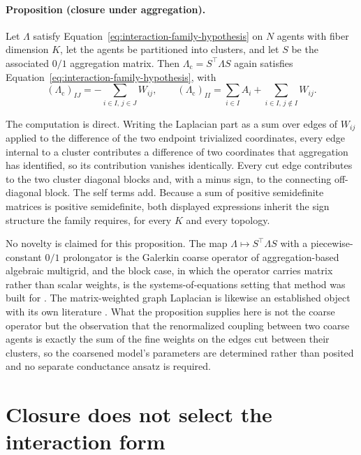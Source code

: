 \paragraph{Proposition (closure under aggregation).}
Let \(\Lambda\) satisfy Equation~\eqref{eq:interaction-family-hypothesis} on \(N\) agents with fiber dimension \(K\), let the agents be partitioned into clusters, and let \(S\) be the associated \(0/1\) aggregation matrix. Then \(\Lambda_{\mathrm{c}}=S^{\top}\Lambda S\) again satisfies Equation~\eqref{eq:interaction-family-hypothesis}, with
\begin{equation}
(\Lambda_{\mathrm{c}})_{IJ}
=-\sum_{i\in I,\,j\in J}W_{ij},
\qquad
(\Lambda_{\mathrm{c}})_{II}
=\sum_{i\in I}A_i+\sum_{i\in I,\,j\notin I}W_{ij}.
\label{eq:coarse-tying-blocks}
\end{equation}

The computation is direct. Writing the Laplacian part as a sum over edges of \(W_{ij}\) applied to the difference of the two endpoint trivialized coordinates, every edge internal to a cluster contributes a difference of two coordinates that aggregation has identified, so its contribution vanishes identically. Every cut edge contributes to the two cluster diagonal blocks and, with a minus sign, to the connecting off-diagonal block. The self terms add. Because a sum of positive semidefinite matrices is positive semidefinite, both displayed expressions inherit the sign structure the family requires, for every \(K\) and every topology.

No novelty is claimed for this proposition. The map \(\Lambda\mapsto S^{\top}\Lambda S\) with a piecewise-constant \(0/1\) prolongator is the Galerkin coarse operator of aggregation-based algebraic multigrid, and the block case, in which the operator carries matrix rather than scalar weights, is the systems-of-equations setting that method was built for \citep{VanekMandelBrezina1996,Lee2024AMGSystems}. The matrix-weighted graph Laplacian is likewise an established object with its own literature \citep{Trinh2018MatrixWeighted}. What the proposition supplies here is not the coarse operator but the observation that the renormalized coupling between two coarse agents is exactly the sum of the fine weights on the edges cut between their clusters, so the coarsened model's parameters are determined rather than posited and no separate conductance ansatz is required.

\section{Closure does not select the interaction form}


